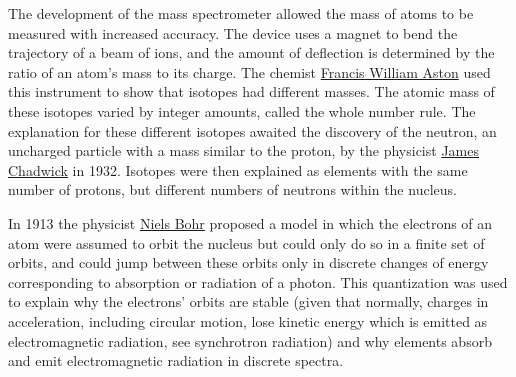 The development of the mass spectrometer allowed the mass of atoms to be
measured with increased accuracy. The device uses a magnet to bend the
trajectory of a beam of ions, and the amount of deflection is determined
by the ratio of an atom's mass to its charge. The chemist
\href{https://en.wikipedia.org/wiki/Francis_William_Aston}{Francis
William Aston} used this instrument to show that isotopes had different
masses. The atomic mass of these isotopes varied by integer amounts,
called the whole number rule. The explanation for these different
isotopes awaited the discovery of the neutron, an uncharged particle
with a mass similar to the proton, by the physicist
\href{https://en.wikipedia.org/wiki/James_Chadwick}{James Chadwick} in
1932. Isotopes were then explained as elements with the same number of
protons, but different numbers of neutrons within the nucleus.

In 1913 the physicist
\href{https://en.wikipedia.org/wiki/Niels_Bohr}{Niels Bohr} proposed a
model in which the electrons of an atom were assumed to orbit the
nucleus but could only do so in a finite set of orbits, and could jump
between these orbits only in discrete changes of energy corresponding to
absorption or radiation of a photon. This quantization was used to
explain why the electrons' orbits are stable (given that normally,
charges in acceleration, including circular motion, lose kinetic energy
which is emitted as electromagnetic radiation, see synchrotron
radiation) and why elements absorb and emit electromagnetic radiation in
discrete spectra.

